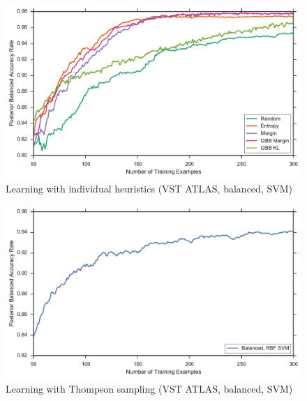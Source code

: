 \begin{figure}[p]
	\centering
	\includegraphics[width=\textwidth]{figures/5_active/vstatlas_br_individuals}
	\caption[Learning with individual heuristics (VST ATLAS, balanced, SVM)]{
		Learning with individual heuristics (VST ATLAS, balanced, SVM)}
	\label{fig:vstatlas_br_individuals}
\end{figure}

\begin{figure}[p]
	\centering
	\includegraphics[width=\textwidth]{figures/5_thompson/vstatlas_br_thompson}
	\caption[Learning with Thompson sampling (VST ATLAS, balanced, SVM)]{
		Learning with Thompson sampling (VST ATLAS, balanced, SVM)}
	\label{fig:vstatlas_br_thompson}
\end{figure}

